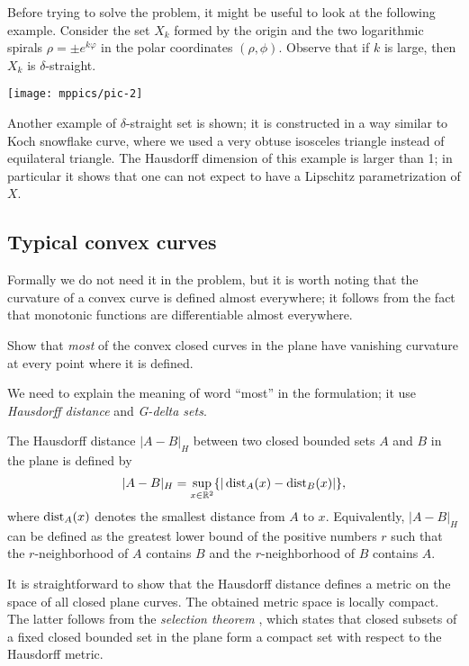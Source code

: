 Before trying to solve the problem, it might be useful to look at the following example.
Consider the set $X_k$ formed by the origin and the two logarithmic spirals $\rho = \pm e^{k\varphi}$ in the polar coordinates $(\rho,\phi)$.
Observe that if $k$ is large, then $X_k$ is $\delta$-straight.

\hskip-30mm\texttt{[image: mppics/pic-2]}

Another example of $\delta$-straight set is shown; it is constructed in a way similar to Koch snowflake curve, where we used a very obtuse isosceles triangle instead of equilateral triangle.
The Hausdorff dimension of this example is larger than 1;
in particular it shows that one can not expect to have a Lipschitz parametrization of $X$.




\subsection*{Typical convex curves}

Formally we do not need it in the problem, 
but it is worth noting that the curvature of a convex curve is defined almost everywhere;
it follows from the fact that monotonic functions are differentiable almost everywhere.

\begin{pr}
Show that \emph{most} of the convex closed curves in the plane
have vanishing curvature at every point where it is defined.
\end{pr}

We need to explain the meaning of word ``most'' in the formulation;
it use \emph{Hausdorff distance} and \emph{G-delta sets}.

The Hausdorff distance $|A-B|_H$ between two closed bounded sets $A$ and $B$ in the plane is defined by 
\[|A-B|_H=\sup_{x\in\mathbb{R}^2}\{|\operatorname{\rm dist}\nolimits_A(x)-\operatorname{\rm dist}\nolimits_B(x)|\},\]
where $\operatorname{\rm dist}\nolimits_A(x)$ denotes the smallest distance from $A$ to $x$.
Equivalently, $|A-B|_H$ can be defined as the greatest lower bound of the positive numbers $r$ such that the $r$-neighborhood of $A$ contains $B$ and the $r$-neighborhood of $B$ contains $A$.

It is straightforward to show that the Hausdorff distance defines a metric on the space of all closed plane curves.
The obtained metric space is locally compact.
The latter follows from the \emph{selection theorem} \cite[see \S18 in][]{blaschke},
which states that closed subsets of a fixed closed bounded set in the plane form a compact set with respect to the Hausdorff metric. 


